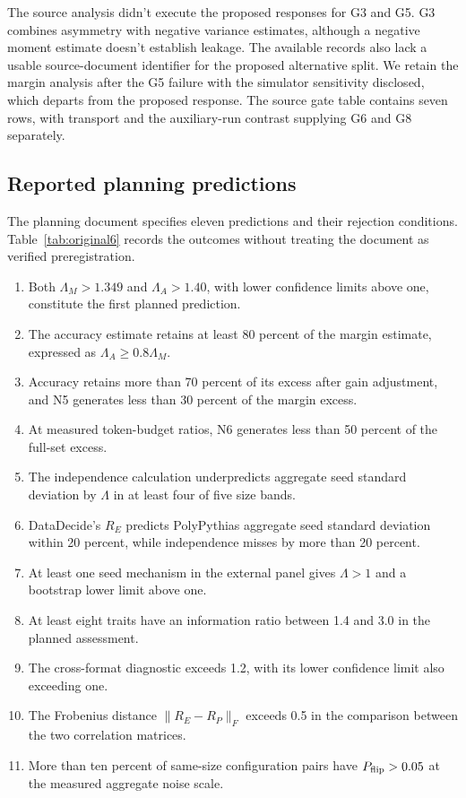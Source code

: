 The source analysis didn't execute the proposed responses for G3 and G5. G3 combines asymmetry with negative variance estimates, although a negative moment estimate doesn't establish leakage. The available records also lack a usable source-document identifier for the proposed alternative split. We retain the margin analysis after the G5 failure with the simulator sensitivity disclosed, which departs from the proposed response. The source gate table contains seven rows, with transport and the auxiliary-run contrast supplying G6 and G8 separately.

\subsection{Reported planning predictions}
The planning document specifies eleven predictions and their rejection conditions. Table~\ref{tab:original6} records the outcomes without treating the document as verified preregistration.
\begin{enumerate}
\item Both $\Lambda_M>1.349$ and $\Lambda_A>1.40$, with lower confidence limits above one, constitute the first planned prediction.
\item The accuracy estimate retains at least 80 percent of the margin estimate, expressed as $\Lambda_A\geq0.8\Lambda_M$.
\item Accuracy retains more than 70 percent of its excess after gain adjustment, and N5 generates less than 30 percent of the margin excess.
\item At measured token-budget ratios, N6 generates less than 50 percent of the full-set excess.
\item The independence calculation underpredicts aggregate seed standard deviation by $\Lambda$ in at least four of five size bands.
\item DataDecide's $R_E$ predicts PolyPythias aggregate seed standard deviation within 20 percent, while independence misses by more than 20 percent.
\item At least one seed mechanism in the external panel gives $\Lambda>1$ and a bootstrap lower limit above one.
\item At least eight traits have an information ratio between 1.4 and 3.0 in the planned assessment.
\item The cross-format diagnostic exceeds 1.2, with its lower confidence limit also exceeding one.
\item The Frobenius distance $\|R_E-R_P\|_F$ exceeds 0.5 in the comparison between the two correlation matrices.
\item More than ten percent of same-size configuration pairs have $P_{\rm flip}>0.05$ at the measured aggregate noise scale.
\end{enumerate}

